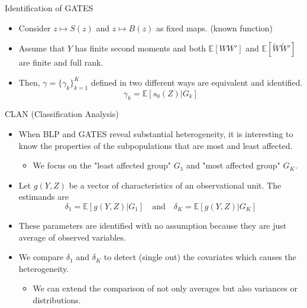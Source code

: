 \documentclass[xcolor=svgnames,aspectratio=169]{beamer}
\newcommand{\E}{\mathbb{E}}
\begin{document}
\begin{frame}{Identification of GATES}
    \begin{itemize}
        \begin{tcolorbox}[colframe=Cyan,title=Theorem 3]
        \begin{itemize}
            \item Consider $z\mapsto S(z)$ and $z\mapsto B(z)$ as fixed maps. (known function)
            \item Assume that $Y$ has finite second moments and  both $\E[WW']$ and $\E[\tilde{W}\tilde{W}']$ are finite and full rank.
            \item Then, $\gamma=\{\gamma_k\}_{k=1}^K$ defined in two different ways are equivalent and identified.
            \[
            \gamma_k=\E[s_0(Z)|G_k]
            \]
        \end{itemize}
    \end{tcolorbox}
    \end{itemize}
\end{frame}

\begin{frame}{CLAN (Classification Analysis)}
    \begin{itemize}
        \item When BLP and GATES reveal substantial heterogeneity, it is interesting to know \alert{the properties of the subpopulations} that are most and least affected.
        \begin{itemize}
            \item We focus on the "least affected group" $G_1$ and "most affected group" $G_K$.
        \end{itemize}
        \item Let $g(Y,Z)$ be a vector of characteristics of an observational unit. The estimands are 
        \[
        \delta_1=\E[g(Y,Z)|G_1]\quad \text{and}\quad\delta_K=\E[g(Y,Z)|G_K]
        \]
        \item These parameters are identified with no assumption because they are just average of observed variables.
        \item We compare $\delta_1$ and $\delta_K$ to detect (single out) the covariates which causes the heterogeneity.
        \begin{itemize}
            \item We can extend the comparison of not only averages but also variances or distributions.
        \end{itemize}
    \end{itemize}
\end{frame}
\end{document}
